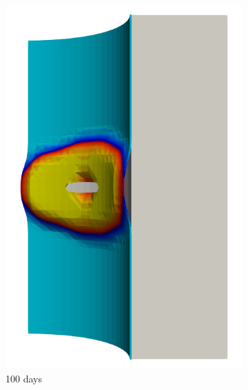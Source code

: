 \begin{figure}[!htb]
\begin{subfigure}[b]{0.2\textwidth}
    \includegraphics[width=\textwidth]{Chapter5/figures/spallation/seed_c_3}
    \caption{100 days}
  \end{subfigure}
  \begin{subfigure}[b]{0.2\textwidth}
    \centering

\end{subfigure}
\end{figure}
